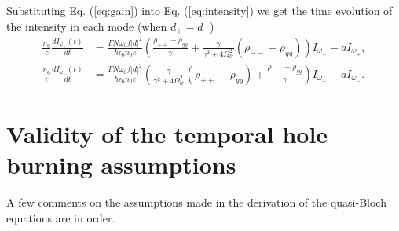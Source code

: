 \documentclass[preprint,secnumarabic,amssymb, nobibnotes, aip, prd]{revtex4-1}
\begin{document}
Substituting Eq. (\ref{eq:gain}) into Eq. (\ref{eq:intensity}) we get the time evolution of the intensity in each mode (when $d_+ = d_-$) 
\begin{align}
\frac{n_0}{c}\frac{dI_{\omega_+}(t)}{dt} &= \frac{\Gamma N\omega_0f|d|^2}{\hbar\epsilon_0 n_0  c}\left(\frac{\rho_{++}-\rho_{gg}}{\gamma} + \frac{\gamma}{\gamma^2+4\Omega_{lr}^2}(\rho_{--}-\rho_{gg})\right)I_{\omega_+} -aI_{\omega_+}, \\
\frac{n_0}{c}\frac{dI_{\omega_-}(t)}{dt} &= \frac{\Gamma N\omega_0f|d|^2}{\hbar\epsilon_0 n_0  c}\left(\frac{\gamma}{\gamma^2+4\Omega_{lr}^2}(\rho_{++}-\rho_{gg})+\frac{\rho_{--}-\rho_{gg}}{\gamma} \right)I_{\omega_-} -aI_{\omega_-}.
\end{align}


\section{Validity of the temporal hole burning assumptions}
A few comments on the assumptions made in the derivation of the quasi-Bloch equations are in order. 
\end{document}
